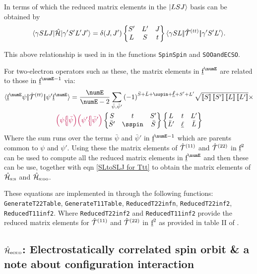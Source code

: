 \documentclass{article}
\newcommand{\codetext}[1]{{\color{BlueViolet} \texttt{#1}}}
\begin{document}
In terms of which the reduced matrix elements in the $|LSJ\rangle$ basis can be obtained by
\begin{equation}
    \langle \gamma{SLJ}|\hat{\mathcal{H}}|\gamma'{S'L'J'}\rangle = \delta(J,J') \begin{Bmatrix} S' & L' & J \\ L & S & t \end{Bmatrix} \langle \gamma{SL}|\!|\hat{\mathcal{T}}^{(tt)}_{}|\!|\gamma'{S'L'}\rangle.
\label{SLtoSLJ for Ttt}
\end{equation}

This above relationship is used in \qlanth in the functions \codetext{SpinSpin} and \codetext{SOOandECSO}.

For two-electron operators such as these, the matrix elements in $\forb^\numE$ are related to those in $\forb^{\numE-1}$ via:
\begin{multline}
    \redbraopket{\forb^\numE\psi}{\Txyz{t}{t}{}}{\psi'\forb^\numE} 
    = \frac{\numE}{\numE-2} 
    \sum_{\bar{\psi},\bar{\psi}'}
    \phaser{\bar{S}+\bar{L}+\sspin+\lorb+S'+L'}
    \sqrt{\tpobraket{S}\tpobraket{S'}\tpobraket{L}\tpobraket{L'}} \times \\
    \cfpinv{\psi}{\bar{\psi}}
    \cfpinv{\psi'}{\bar{\psi}'} 
    \sixj{S}{t}{S'}{\bar{S}'}{\sspin}{\bar{S}}
    \sixj{L}{t}{L'}{\bar{L}'}{\lorb}{\bar{L}}
\label{double cfp escalator}
\end{multline}
Where the sum runs over the terms $\bar{\psi}$ and $\bar{\psi}'$ in $\forb^{\numE-1}$ which are parents common to $\psi$ and $\psi'$. Using these the matrix elements of $\hat{\mathcal{T}}^{(11)}_{}$ and $\hat{\mathcal{T}}^{(22)}_{}$ in $\underbar{$\text{f}$}^2$ can be used to compute all the reduced matrix elements in  $\forb^\numE$ and then these can be use, together with eqn \ref{SLtoSLJ for Ttt} to obtain the matrix elements of $\hat{\mathcal{H}}_{\text{s:s}}$ and $\hat{\mathcal{H}}_\text{s:oo}$.

These equations are implemented in \qlanth through the following functions: \codetext{GenerateT22Table}, \codetext{GenerateT11Table}, \codetext{ReducedT22infn}, \codetext{ReducedT22inf2}, \codetext{ReducedT11inf2}. Where \codetext{ReducedT22inf2} and \codetext{ReducedT11inf2} provide the reduced matrix elements for $\hat{\mathcal{T}}^{(11)}_{}$ and $\hat{\mathcal{T}}^{(22)}_{}$ in $\underbar{$\text{f}$}^2$ as provided in table II of \cite{judd_intra-atomic_1968}.

\subsection{$\hat{\mathcal{H}}_{\text{ecs:o}}$: Electrostatically correlated spin orbit \& a note about configuration interaction}
\end{document}
